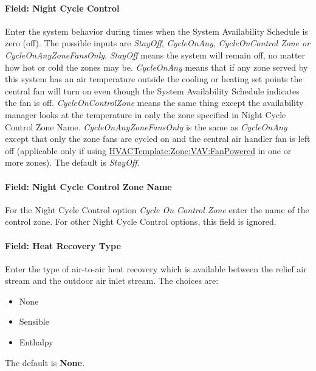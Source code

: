 \paragraph{Field: Night Cycle Control}\label{field-night-cycle-control-2}

Enter the system behavior during times when the System Availability Schedule is zero (off). The possible inputs are \emph{StayOff}, \emph{CycleOnAny}, \emph{CycleOnControl Zone or CycleOnAnyZoneFansOnly}. \emph{StayOff} means the system will remain off, no matter how hot or cold the zones may be. \emph{CycleOnAny} means that if any zone served by this system has an air temperature outside the cooling or heating set points the central fan will turn on even though the System Availability Schedule indicates the fan is off. \emph{CycleOnControlZone} means the same thing except the availability manager looks at the temperature in only the zone specified in Night Cycle Control Zone Name. \emph{CycleOnAnyZoneFansOnly} is the same as \emph{CycleOnAny} except that only the zone fans are cycled on and the central air handler fan is left off (applicable only if using \hyperref[hvactemplatezonevavfanpowered]{HVACTemplate:Zone:VAV:FanPowered} in one or more zones). The default is \emph{StayOff}.

\paragraph{Field: Night Cycle Control Zone Name}\label{field-night-cycle-control-zone-name-2}

For the Night Cycle Control option \emph{Cycle On Control Zone} enter the name of the control zone. For other Night Cycle Control options, this field is ignored.

\paragraph{Field: Heat Recovery Type}\label{field-heat-recovery-type-4}

Enter the type of air-to-air heat recovery which is available between the relief air stream and the outdoor air inlet stream. The choices are:

\begin{itemize}
\item
  None
\item
  Sensible
\item
  Enthalpy
\end{itemize}

The default is \textbf{None}\emph{.}

